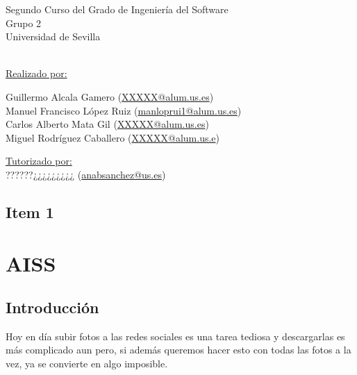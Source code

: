 \documentclass{scrartcl}
\begin{document}
\begin{titlepage}
\begin{center}
\begin{Large}
	Segundo Curso del Grado de Ingeniería del Software\\
	Grupo 2\\
	Universidad de Sevilla	
	\end{Large}\\
	\vspace*{0.4in}
	\underline{Realizado por:} \\
		\vspace*{0.1in}
		\begin{large}
		Guillermo Alcala Gamero (\href{mailto:manloprui1@alum.us.es}{XXXXX@alum.us.es})\\
		Manuel Francisco López Ruiz (\href{mailto:manloprui1@alum.us.es}{manloprui1@alum.us.es})\\
		Carlos Alberto Mata Gil
		(\href{mailto:manloprui1@alum.us.es}{XXXXX@alum.us.es})\\
		Miguel Rodríguez Caballero (\href{mailto:miguel.rc95@gmail.com}{XXXXX@alum.us.e})\\
		\end{large}
		\vspace*{0.2in}
		\underline{Tutorizado por:}\\
		\vspace*{0.1in}
		??????¿¿¿¿¿¿¿¿¿ (\href{mailto:anabsanchez@us.es}{anabsanchez@us.es})\\

	
	
\end{center}
\end{titlepage}
\newpage

\tableofcontents %

\newpage
\section{Item 1}



\newpage
\chapter{AISS}
\section{Introducción}
Hoy en día subir fotos a las redes sociales es una tarea tediosa y descargarlas es más complicado aun pero, si además queremos hacer esto con todas las fotos a la vez, ya se convierte en algo imposible.
\end{document}

